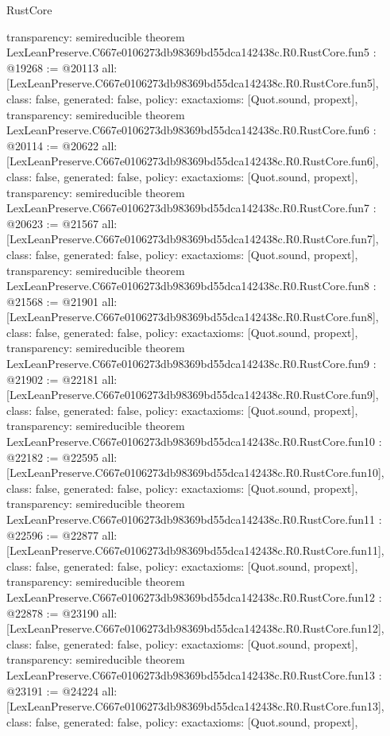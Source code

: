 \begin{lexlean}{RustCore}
\begin{coremodule}
{  transparency: semireducible
}
theorem LexLeanPreserve.C667e0106273db98369bd55dca142438c.R0.RustCore.fun5 : @19268 := @20113 {
  all: [LexLeanPreserve.C667e0106273db98369bd55dca142438c.R0.RustCore.fun5],
  class: false,
  generated: false,
  policy: exact{axioms: [Quot.sound, propext]},
  transparency: semireducible
}
theorem LexLeanPreserve.C667e0106273db98369bd55dca142438c.R0.RustCore.fun6 : @20114 := @20622 {
  all: [LexLeanPreserve.C667e0106273db98369bd55dca142438c.R0.RustCore.fun6],
  class: false,
  generated: false,
  policy: exact{axioms: [Quot.sound, propext]},
  transparency: semireducible
}
theorem LexLeanPreserve.C667e0106273db98369bd55dca142438c.R0.RustCore.fun7 : @20623 := @21567 {
  all: [LexLeanPreserve.C667e0106273db98369bd55dca142438c.R0.RustCore.fun7],
  class: false,
  generated: false,
  policy: exact{axioms: [Quot.sound, propext]},
  transparency: semireducible
}
theorem LexLeanPreserve.C667e0106273db98369bd55dca142438c.R0.RustCore.fun8 : @21568 := @21901 {
  all: [LexLeanPreserve.C667e0106273db98369bd55dca142438c.R0.RustCore.fun8],
  class: false,
  generated: false,
  policy: exact{axioms: [Quot.sound, propext]},
  transparency: semireducible
}
theorem LexLeanPreserve.C667e0106273db98369bd55dca142438c.R0.RustCore.fun9 : @21902 := @22181 {
  all: [LexLeanPreserve.C667e0106273db98369bd55dca142438c.R0.RustCore.fun9],
  class: false,
  generated: false,
  policy: exact{axioms: [Quot.sound, propext]},
  transparency: semireducible
}
theorem LexLeanPreserve.C667e0106273db98369bd55dca142438c.R0.RustCore.fun10 : @22182 := @22595 {
  all: [LexLeanPreserve.C667e0106273db98369bd55dca142438c.R0.RustCore.fun10],
  class: false,
  generated: false,
  policy: exact{axioms: [Quot.sound, propext]},
  transparency: semireducible
}
theorem LexLeanPreserve.C667e0106273db98369bd55dca142438c.R0.RustCore.fun11 : @22596 := @22877 {
  all: [LexLeanPreserve.C667e0106273db98369bd55dca142438c.R0.RustCore.fun11],
  class: false,
  generated: false,
  policy: exact{axioms: [Quot.sound, propext]},
  transparency: semireducible
}
theorem LexLeanPreserve.C667e0106273db98369bd55dca142438c.R0.RustCore.fun12 : @22878 := @23190 {
  all: [LexLeanPreserve.C667e0106273db98369bd55dca142438c.R0.RustCore.fun12],
  class: false,
  generated: false,
  policy: exact{axioms: [Quot.sound, propext]},
  transparency: semireducible
}
theorem LexLeanPreserve.C667e0106273db98369bd55dca142438c.R0.RustCore.fun13 : @23191 := @24224 {
  all: [LexLeanPreserve.C667e0106273db98369bd55dca142438c.R0.RustCore.fun13],
  class: false,
  generated: false,
  policy: exact{axioms: [Quot.sound, propext]},
}
\end{coremodule}
\end{lexlean}
